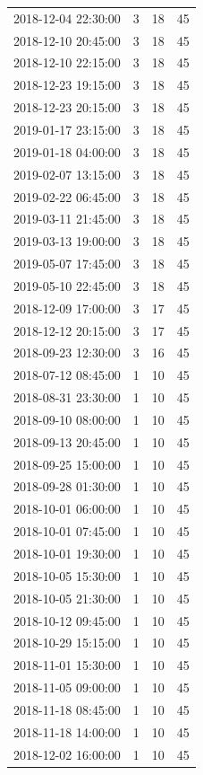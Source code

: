\begin{tabular}{lrrr}
2018-12-04 22:30:00 & 3 & 18 & 45 \\
2018-12-10 20:45:00 & 3 & 18 & 45 \\
2018-12-10 22:15:00 & 3 & 18 & 45 \\
2018-12-23 19:15:00 & 3 & 18 & 45 \\
2018-12-23 20:15:00 & 3 & 18 & 45 \\
2019-01-17 23:15:00 & 3 & 18 & 45 \\
2019-01-18 04:00:00 & 3 & 18 & 45 \\
2019-02-07 13:15:00 & 3 & 18 & 45 \\
2019-02-22 06:45:00 & 3 & 18 & 45 \\
2019-03-11 21:45:00 & 3 & 18 & 45 \\
2019-03-13 19:00:00 & 3 & 18 & 45 \\
2019-05-07 17:45:00 & 3 & 18 & 45 \\
2019-05-10 22:45:00 & 3 & 18 & 45 \\
2018-12-09 17:00:00 & 3 & 17 & 45 \\
2018-12-12 20:15:00 & 3 & 17 & 45 \\
2018-09-23 12:30:00 & 3 & 16 & 45 \\
2018-07-12 08:45:00 & 1 & 10 & 45 \\
2018-08-31 23:30:00 & 1 & 10 & 45 \\
2018-09-10 08:00:00 & 1 & 10 & 45 \\
2018-09-13 20:45:00 & 1 & 10 & 45 \\
2018-09-25 15:00:00 & 1 & 10 & 45 \\
2018-09-28 01:30:00 & 1 & 10 & 45 \\
2018-10-01 06:00:00 & 1 & 10 & 45 \\
2018-10-01 07:45:00 & 1 & 10 & 45 \\
2018-10-01 19:30:00 & 1 & 10 & 45 \\
2018-10-05 15:30:00 & 1 & 10 & 45 \\
2018-10-05 21:30:00 & 1 & 10 & 45 \\
2018-10-12 09:45:00 & 1 & 10 & 45 \\
2018-10-29 15:15:00 & 1 & 10 & 45 \\
2018-11-01 15:30:00 & 1 & 10 & 45 \\
2018-11-05 09:00:00 & 1 & 10 & 45 \\
2018-11-18 08:45:00 & 1 & 10 & 45 \\
2018-11-18 14:00:00 & 1 & 10 & 45 \\
2018-12-02 16:00:00 & 1 & 10 & 45 \\

\end{tabular}
